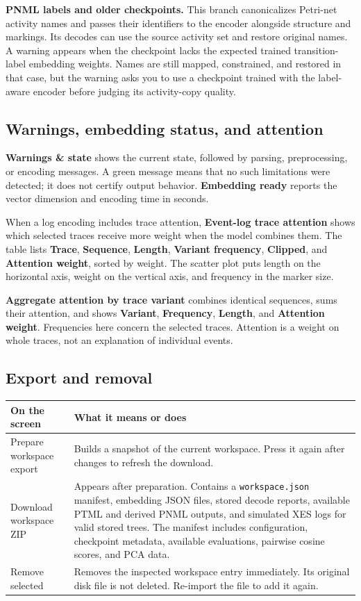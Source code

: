 \documentclass[11pt,a4paper]{article}
\makeatletter
\newcommand{\ui}[1]{\textbf{#1}}
\newcommand{\code}[1]{\nolinkurl{#1}}
\newenvironment{controls}{%
  \small\begin{longtable}{@{}>{\raggedright\arraybackslash}p{.34\linewidth}
    >{\raggedright\arraybackslash}p{.62\linewidth}@{}}
  \toprule\textbf{On the screen} & \textbf{What it means or does}\\\midrule\endhead
  \bottomrule\endfoot
}{\end{longtable}\normalsize}
\makeatother
\begin{document}
\textbf{PNML labels and older checkpoints.} This branch canonicalizes Petri-net
activity names and passes their identifiers to the encoder alongside structure
and markings. Its decodes can use the source activity set and restore original
names. A warning appears when the checkpoint lacks the expected trained
transition-label embedding weights. Names are still mapped, constrained, and
restored in that case, but the warning asks you to use a checkpoint trained
with the label-aware encoder before judging its activity-copy quality.

\subsection{Warnings, embedding status, and attention}
\ui{Warnings \& state} shows the current state, followed by parsing,
preprocessing, or encoding messages. A green message means that no such
limitations were detected; it does not certify output behavior.
\ui{Embedding ready} reports the vector dimension and encoding time in seconds.

When a log encoding includes trace attention, \ui{Event-log trace attention}
shows which selected traces receive more weight when the model combines them.
The table lists \ui{Trace}, \ui{Sequence}, \ui{Length},
\ui{Variant frequency}, \ui{Clipped}, and \ui{Attention weight}, sorted by
weight. The scatter plot puts length on the horizontal axis, weight on the
vertical axis, and frequency in the marker size.

\ui{Aggregate attention by trace variant} combines identical sequences,
sums their attention, and shows \ui{Variant}, \ui{Frequency}, \ui{Length},
and \ui{Attention weight}. Frequencies here concern the selected traces.
Attention is a weight on whole traces, not an explanation of individual events.

\subsection{Export and removal}
\begin{controls}
Prepare workspace export & Builds a snapshot of the current workspace. Press
it again after changes to refresh the download.\\
Download workspace ZIP & Appears after preparation. Contains a
\code{workspace.json} manifest, embedding JSON files, stored decode reports,
available PTML and derived PNML outputs, and simulated XES logs for valid
stored trees. The manifest includes configuration, checkpoint metadata,
available evaluations, pairwise cosine scores, and PCA data.\\
Remove selected & Removes the inspected workspace entry immediately. Its
original disk file is not deleted. Re-import the file to add it again.\\
\end{controls}
\end{document}

